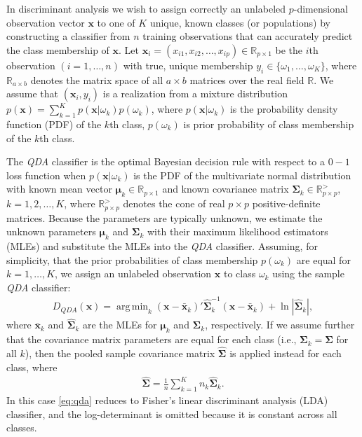 \documentclass[11pt]{article}
\newcommand{\xbar}{\bar{\bm x}}
\DeclareMathOperator*{\argmin}{arg\,min}
\begin{document}
In discriminant analysis we wish to assign correctly an unlabeled $p$-dimensional observation vector $\bm x$ to one of $K$ unique, known classes (or populations) by constructing a classifier from $n$ training observations that can accurately predict the class membership of $\bm x$. Let $\bm x_i = (x_{i1}, x_{i2}, \ldots, x_{ip}) \in \mathbb{R}_{p \times 1}$ be the $i$th observation $(i = 1, \ldots, n)$ with true, unique membership $y_i \in \{\omega_1, \ldots, \omega_K\}$, where $\mathbb{R}_{a \times b}$ denotes the matrix space of all $a \times b$ matrices over the real field $\mathbb{R}$. We assume that $(\bm x_i, y_i)$ is a realization from a mixture distribution $p(\bm x) = \sum_{k=1}^K p(\bm x | \omega_k) p(\omega_k)$, where $p(\bm x | \omega_k)$ is the probability density function (PDF) of the $k$th class, $p(\omega_k)$ is prior probability of class membership of the $k$th class.

The \emph{QDA} classifier is the optimal Bayesian decision rule with respect to a $0-1$ loss function when $p(\bm x | \omega_k)$ is the PDF of the multivariate normal distribution with known mean vector  $\bm\mu_k \in \mathbb{R}_{p \times 1}$ and known covariance matrix $\bm\Sigma_k \in \mathbb{R}_{p \times p}^{>}$, $k = 1, 2, \ldots, K$, where $\mathbb{R}_{p \times p}^{>}$ denotes the cone of real $p \times p$ positive-definite matrices. Because the parameters are typically unknown, we estimate the unknown parameters $\bm \mu_k$ and $\bm\Sigma_k$ with their maximum likelihood estimators (MLEs) and substitute the MLEs into the \emph{QDA} classifier. Assuming, for simplicity, that the prior probabilities of class membership $p(\omega_k)$ are equal for $k = 1, \ldots, K$, we assign an unlabeled observation $\bm x$ to class $\omega_k$ using the sample \emph{QDA} classifier:
\begin{align}
	D_{QDA}(\bm x) = \argmin_{k}  (\bm x - \xbar_k)'\widehat{\bm\Sigma}_k^{-1}(\bm x - \xbar_k)  + \ln |\widehat{\bm\Sigma}_k|, \label{eq:qda}
\end{align}
where $\xbar_k$ and $\widehat{\bm\Sigma}_k$ are the MLEs for $\bm \mu_k$ and $\bm \Sigma_k$, respectively. If we assume further that the covariance matrix parameters are equal for each class (i.e., $\bm\Sigma_k = \bm\Sigma$ for all $k$), then the pooled sample covariance matrix $\widehat{\bm\Sigma}$ is applied instead for each class, where
\begin{align}
	\widehat{\bm\Sigma} = \frac{1}{n} \sum_{k=1}^K n_k \widehat{\bm\Sigma}_k. \label{eq:pooled-cov}
\end{align}
In this case \eqref{eq:qda} reduces to Fisher's linear discriminant analysis (LDA) classifier, and the log-determinant is omitted because it is constant across all classes.
\end{document}
